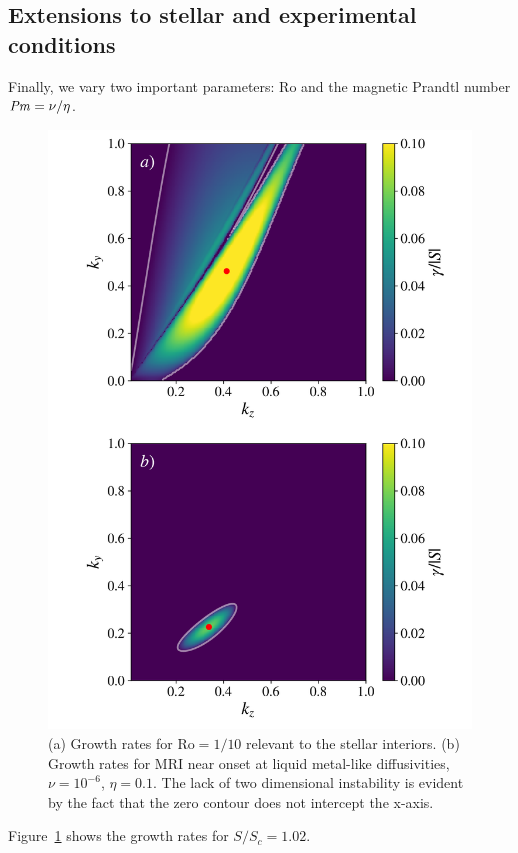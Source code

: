 \documentclass{rsproca_new}%
\newcommand{\SSC}{S/S_{c}}
\newcommand{\Prm}{\mbox{\textit{Pm}}}
\newcommand{\Ro}{\mathrm{Ro}}
\begin{document}
\subsection{Extensions to stellar and experimental conditions}
\label{sec:extensions}

Finally, we vary two important parameters:
$\Ro$ and the magnetic Prandtl number $\Prm=\nu/\eta$.
\begin{figure}[h!]
  \centering
  \includegraphics[width=\columnwidth]{low_rossby_liquid_metal_growth_rates.pdf}
  \caption{(a) Growth rates for $\Ro=1/10$ relevant to the stellar interiors. 
  (b) Growth rates for MRI near onset at liquid metal-like diffusivities, $\nu=10^{-6}$, $\eta=0.1$.
The lack of two dimensional instability is evident by the fact that the zero contour does not intercept the x-axis.}
  \label{fig:other_params}
\end{figure}
Figure~\ref{fig:other_params} shows the growth rates for $\SSC=1.02$.
\end{document}
